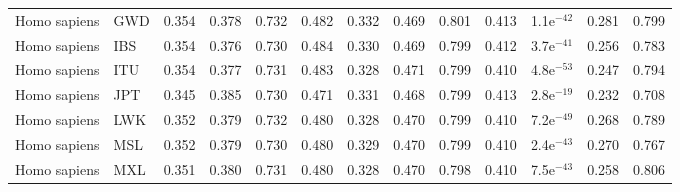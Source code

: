 \begin{longtable}{llrrrrrrrrrrr}
        Homo sapiens &                       GWD &                              0.354 &                               0.378 &                 0.732 &                 0.482 &                              0.332 &                               0.469 &                 0.801 &                 0.413 &  1.1e$^{-42}$ &  0.281 &  0.799 \\
        Homo sapiens &                       IBS &                              0.354 &                               0.376 &                 0.730 &                 0.484 &                              0.330 &                               0.469 &                 0.799 &                 0.412 &  3.7e$^{-41}$ &  0.256 &  0.783 \\
        Homo sapiens &                       ITU &                              0.354 &                               0.377 &                 0.731 &                 0.483 &                              0.328 &                               0.471 &                 0.799 &                 0.410 &  4.8e$^{-53}$ &  0.247 &  0.794 \\
        Homo sapiens &                       JPT &                              0.345 &                               0.385 &                 0.730 &                 0.471 &                              0.331 &                               0.468 &                 0.799 &                 0.413 &  2.8e$^{-19}$ &  0.232 &  0.708 \\
        Homo sapiens &                       LWK &                              0.352 &                               0.379 &                 0.732 &                 0.480 &                              0.328 &                               0.470 &                 0.799 &                 0.410 &  7.2e$^{-49}$ &  0.268 &  0.789 \\
        Homo sapiens &                       MSL &                              0.352 &                               0.379 &                 0.730 &                 0.480 &                              0.329 &                               0.470 &                 0.799 &                 0.410 &  2.4e$^{-43}$ &  0.270 &  0.767 \\
        Homo sapiens &                       MXL &                              0.351 &                               0.380 &                 0.731 &                 0.480 &                              0.328 &                               0.470 &                 0.798 &                 0.410 &  7.5e$^{-43}$ &  0.258 &  0.806 \\

\end{longtable}
